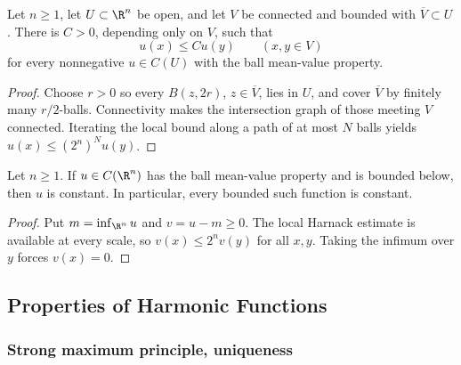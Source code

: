 \begin{theorem}
\label{thm:harnack-global-mvp}
\leanok
Let $n\ge1$, let $U\subset\R^n$ be open, and let $V$ be connected and bounded
with $\overline V\subset U$. There is $C>0$, depending only on $V$, such that
$$u(x)\le C u(y)\qquad(x,y\in V)$$
for every nonnegative $u\in C(U)$ with the ball mean-value property.
\end{theorem}
\begin{proof}
\leanok
\sketch Choose $r>0$ so every $B(z,2r)$, $z\in\overline V$, lies in $U$, and
cover $\overline V$ by finitely many $r/2$-balls. Connectivity makes the
intersection graph of those meeting $V$ connected. Iterating the local bound
along a path of at most $N$ balls yields $u(x)\le(2^n)^N u(y)$.
\end{proof}

\begin{theorem}
\label{thm:liouville-mvp}
\leanok
Let $n\ge1$. If $u\in C(\R^n)$ has the ball mean-value property and is bounded
below, then $u$ is constant. In particular, every bounded such function is
constant.
\end{theorem}
\begin{proof}
\leanok
\sketch Put $m=\inf_{\R^n}u$ and $v=u-m\ge0$. The local Harnack estimate is
available at every scale, so $v(x)\le2^n v(y)$ for all $x,y$. Taking the
infimum over $y$ forces $v(x)=0$.
\end{proof}

\subsection{Properties of Harmonic Functions}
\label{sec:laplace-properties-harmonic-functions}

\subsubsection{Strong maximum principle, uniqueness}
\label{sec:laplace-strong-maximum-principle}

